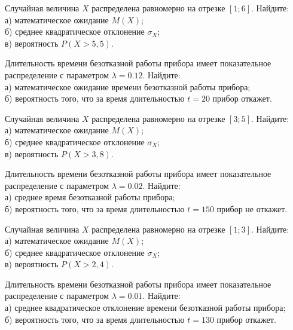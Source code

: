 

\z Случайная величина $X$ распределена равномерно на отрезке $[1; 6]$. Найдите: \\ \quad а) математическое ожидание $M(X)$; \\ \quad б) среднее квадратическое отклонение $\sigma_X$; \\ \quad в) вероятность $P(X>5{,}5)$.


\vfill

\z Длительность времени безотказной работы прибора имеет показательное распределение с параметром $\lambda = 0.12$. Найдите: \\ \quad а) математическое ожидание времени безотказной работы прибора; \\ \quad б) вероятность того, что за время длительностью $t = 20$ прибор откажет.
 

\vfill

\newpage\setcounter{zad}{0}

\z Случайная величина $X$ распределена равномерно на отрезке $[3; 5]$. Найдите: \\ \quad а) математическое ожидание $M(X)$; \\ \quad б) среднее квадратическое отклонение $\sigma_X$; \\ \quad в) вероятность $P(X>3{,}8)$.


\vfill

\z Длительность времени безотказной работы прибора имеет показательное распределение с параметром $\lambda = 0.02$. Найдите: \\ \quad а) среднее время безотказной работы прибора; \\ \quad б) вероятность того, что за время длительностью $t = 150$ прибор не откажет.
 

\vfill

\newpage\setcounter{zad}{0}

\z Случайная величина $X$ распределена равномерно на отрезке $[1; 3]$. Найдите: \\ \quad а) математическое ожидание $M(X)$; \\ \quad б) среднее квадратическое отклонение $\sigma_X$; \\ \quad в) вероятность $P(X>2{,}4)$.


\vfill

\z Длительность времени безотказной работы прибора имеет показательное распределение с параметром $\lambda = 0.01$. Найдите: \\ \quad а) среднее квадратическое отклонение времени безотказной работы прибора; \\ \quad б) вероятность того, что за время длительностью $t = 130$ прибор откажет.
 

